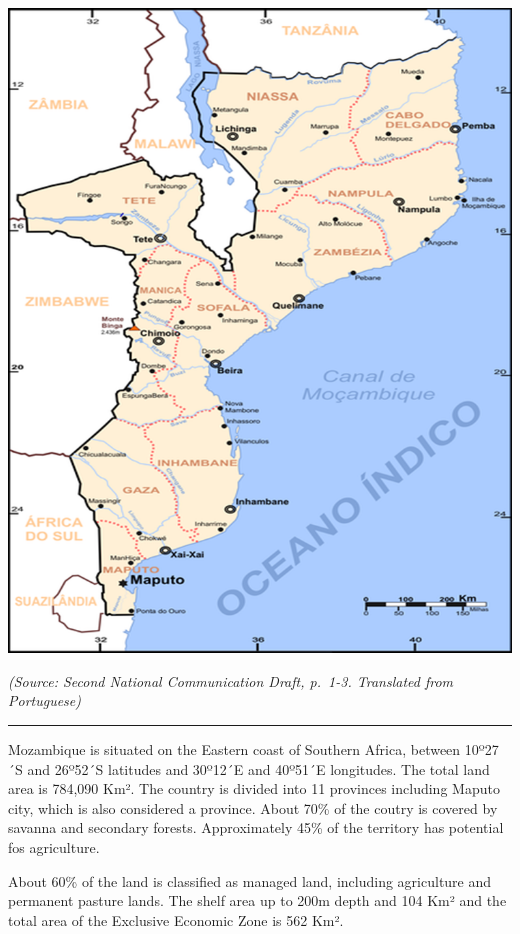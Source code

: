 \documentclass[
]{book}
\begin{document}
\includegraphics{Figure2.png}

\emph{(Source: Second National Communication Draft, p.~1-3. Translated from Portuguese)}

\begin{center}\rule{0.5\linewidth}{0.5pt}\end{center}

Mozambique is situated on the Eastern coast of Southern Africa, between 10º27´S and 26º52´S latitudes and 30º12´E and 40º51´E longitudes. The total land area is 784,090 Km². The country is divided into 11 provinces including Maputo city, which is also considered a province. About 70\% of the coutry is covered by savanna and secondary forests. Approximately 45\% of the territory has potential fos agriculture.

About 60\% of the land is classified as managed land, including agriculture and permanent pasture lands. The shelf area up to 200m depth and 104 Km² and the total area of the Exclusive Economic Zone is 562 Km².
\end{document}
